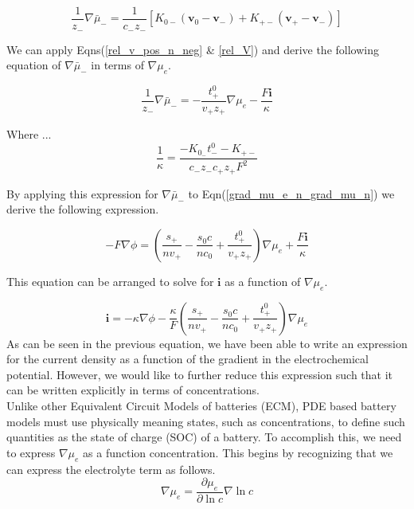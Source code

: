 \documentclass[lettersize,journal]{IEEEtran}
\begin{document}
\begin{equation}
\frac{1}{z_{-}} \nabla \bar{\mu}_{-} =\frac{1}{c_{-} z_{-}}\left[K_{0-}\left(\mathbf{v}_{0}-\mathbf{v}_{-}\right)+K_{+-}\left(\mathbf{v}_{+}-\mathbf{v}_{-}\right)\right]
\end{equation}

\noindent We can apply Eqns(\ref{rel_v_pos_n_neg} \& \ref{rel_V}) and derive the following equation of $\nabla \bar{\mu}_{-}$ in terms of $\nabla \mu_e$.

\begin{equation}
\frac{1}{z_{-}} \nabla \bar{\mu}_{-} =-\frac{t_{+}^{0}}{v_{+} z_{+}} \nabla \mu_{e}-\frac{F \mathbf{i}}{\kappa}
\end{equation}


\noindent Where ...
\begin{equation}
\frac{1}{\kappa}=\frac{-K_{0_{-}} t_{-}^{0}-K_{+-}}{c_{-} z_{-} c_{+} z_{+} F^{2}}
\end{equation}

\noindent By applying this expression for $\nabla \bar{\mu}_{-}$ to Eqn(\ref{grad_mu_e_n_grad_mu_n}) we derive the following expression.


\begin{equation}
-F \nabla \phi =\left(\frac{s_{+}}{n v_{+}}-\frac{s_{0} c}{n c_{0}}+\frac{t_{+}^{0}}{v_{+} z_{+}}\right) \nabla \mu_{e}+\frac{F \mathbf{i}}{\kappa}
\end{equation}

\noindent This equation can be arranged to solve for $\mathbf{i}$ as a function of $\nabla \mu_e$.


\begin{equation}\label{current_density_mu_e}
  \mathbf{i} =-\kappa \nabla \phi-\frac{\kappa}{F}\left(\frac{s_{+}}{n v_{+}}-\frac{s_{0} c}{n c_{0}}+\frac{t_{+}^{0}}{v_{+} z_{+}}\right) \nabla \mu_{e}
\end{equation}
\noindent As can be seen in the previous equation, we have been able to write an expression for the current density as a function of the gradient in the electrochemical potential. However, we would like to further reduce this expression such that it can be written explicitly in terms of concentrations. \\

Unlike other Equivalent Circuit Models of batteries (ECM), PDE based battery models must use physically meaning states, such as concentrations, to define such quantities as the state of charge (SOC) of a battery. To accomplish this, we need to express $\nabla \mu_e$ as a function concentration. This begins by recognizing that we can express the electrolyte term as follows.
\begin{equation}
\nabla \mu_{e}=\frac{\partial \mu_{e}}{\partial \ln c} \nabla \ln c
\end{equation}
\end{document}
